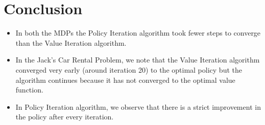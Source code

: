 \documentclass{article}
\begin{document}
\section{Conclusion}
\begin{itemize}
    \item In both the MDPs the Policy Iteration algorithm took fewer steps to converge than the Value Iteration algorithm.
    \item In the Jack's Car Rental Problem, we note that the Value Iteration algorithm converged very early (around iteration 20) 
    to the optimal policy but the algorithm continues because it has not converged to the optimal value function.
    \item In Policy Iteration algorithm, we observe that there is a strict improvement in the policy after every iteration.
\end{itemize}





\end{document}
